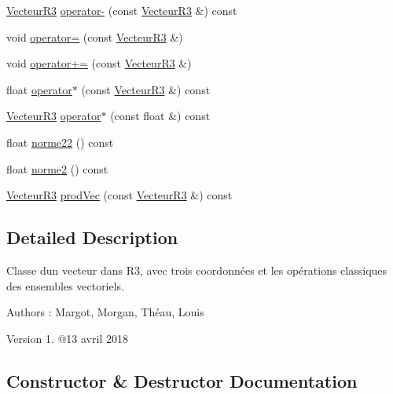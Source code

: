 \begin{DoxyCompactItemize}
\item 
\mbox{\hyperlink{class_vecteur_r3}{Vecteur\+R3}} \mbox{\hyperlink{class_vecteur_r3_a1a041eb37d796dcbb6e9a4d67df2e364}{operator-\/}} (const \mbox{\hyperlink{class_vecteur_r3}{Vecteur\+R3}} \&) const
\item 
void \mbox{\hyperlink{class_vecteur_r3_ab001030cf179f0b78c4b57366132a87c}{operator=}} (const \mbox{\hyperlink{class_vecteur_r3}{Vecteur\+R3}} \&)
\item 
void \mbox{\hyperlink{class_vecteur_r3_ab50dc680b31f24957d39c60b63b71daf}{operator+=}} (const \mbox{\hyperlink{class_vecteur_r3}{Vecteur\+R3}} \&)
\item 
float \mbox{\hyperlink{class_vecteur_r3_adba51a9c03c057ddafd76d4e62de3866}{operator$\ast$}} (const \mbox{\hyperlink{class_vecteur_r3}{Vecteur\+R3}} \&) const
\item 
\mbox{\hyperlink{class_vecteur_r3}{Vecteur\+R3}} \mbox{\hyperlink{class_vecteur_r3_a359b0ad02e7e539d32657d9722c620a6}{operator$\ast$}} (const float \&) const
\item 
float \mbox{\hyperlink{class_vecteur_r3_a014e36cfadce987c292edcf1db615cfd}{norme22}} () const
\item 
float \mbox{\hyperlink{class_vecteur_r3_a6c8bbc72999a06fd23e4213729f585b2}{norme2}} () const
\item 
\mbox{\hyperlink{class_vecteur_r3}{Vecteur\+R3}} \mbox{\hyperlink{class_vecteur_r3_a4fa29ea43737c79245a9ba049308d90b}{prod\+Vec}} (const \mbox{\hyperlink{class_vecteur_r3}{Vecteur\+R3}} \&) const
\end{DoxyCompactItemize}


\subsection{Detailed Description}
Classe d\textquotesingle{}un vecteur dans R3, avec trois coordonnées et les opérations classiques des ensembles vectoriels. \begin{DoxyAuthor}{Authors}
\+: Margot, Morgan, Théau, Louis 
\end{DoxyAuthor}
\begin{DoxyVersion}{Version}
1. @13 avril 2018 
\end{DoxyVersion}


\subsection{Constructor \& Destructor Documentation}
\mbox{\label{class_vecteur_r3_a265cb675642abf1db0fbd99eed4590e7}} 
